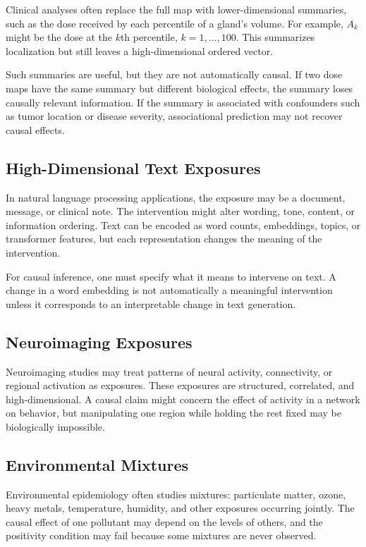 Clinical analyses often replace the full map with lower-dimensional summaries,
such as the dose received by each percentile of a gland's volume. For example,
$A_k$ might be the dose at the $k$th percentile, $k=1,\ldots,100$. This
summarizes localization but still leaves a high-dimensional ordered vector.

Such summaries are useful, but they are not automatically causal. If two dose
maps have the same summary but different biological effects, the summary loses
causally relevant information. If the summary is associated with confounders
such as tumor location or disease severity, associational prediction may not
recover causal effects.

\subsection{High-Dimensional Text Exposures}

In natural language processing applications, the exposure may be a document,
message, or clinical note. The intervention might alter wording, tone, content,
or information ordering. Text can be encoded as word counts, embeddings, topics,
or transformer features, but each representation changes the meaning of the
intervention.

For causal inference, one must specify what it means to intervene on text. A
change in a word embedding is not automatically a meaningful intervention unless
it corresponds to an interpretable change in text generation.

\subsection{Neuroimaging Exposures}

Neuroimaging studies may treat patterns of neural activity, connectivity, or
regional activation as exposures. These exposures are structured, correlated,
and high-dimensional. A causal claim might concern the effect of activity in a
network on behavior, but manipulating one region while holding the rest fixed
may be biologically impossible.

\subsection{Environmental Mixtures}

Environmental epidemiology often studies mixtures: particulate matter, ozone,
heavy metals, temperature, humidity, and other exposures occurring jointly.
The causal effect of one pollutant may depend on the levels of others, and the
positivity condition may fail because some mixtures are never observed.

